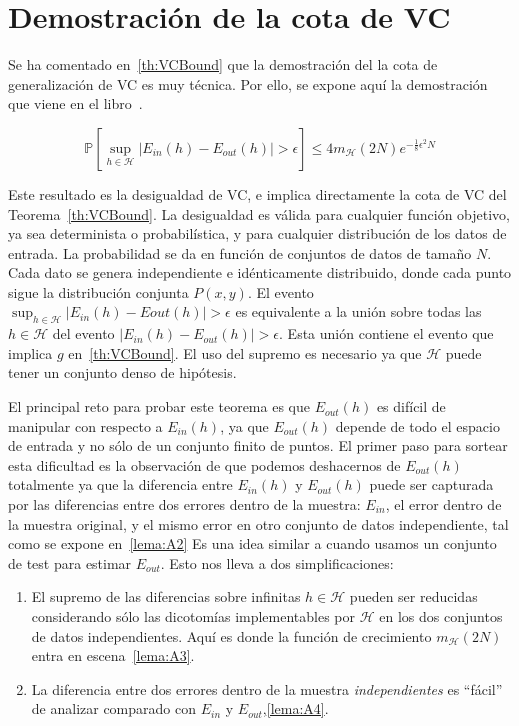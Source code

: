 \appendix
\chapter{Demostración de la cota de VC}
\label{apendice:demVC}
Se ha comentado en~\ref{th:VCBound} que la demostración del la cota de
generalización de VC es muy técnica. Por ello, se expone aquí la demostración
que viene en el libro~\cite{Abu-Mostafa:2012:LD:2207825}.

\begin{teorema}
  \label{th:A1}
   \begin{displaymath}
       \mathbb{P} \left [\sup_{h \in \mathcal{H}} | E_{in}(h) - E_{out}(h) | > \epsilon \right] \leq 4m_{\mathcal{H}}(2N)e^{-\frac{1}{8} \epsilon^2 N}
   \end{displaymath}
\end{teorema}

Este resultado es la desigualdad de VC, e implica directamente la cota de VC
del Teorema~\ref{th:VCBound}. La desigualdad es válida para cualquier función
objetivo, ya sea determinista o probabilística, y para cualquier distribución
de los datos de entrada. La probabilidad se da en función de conjuntos de datos
de tamaño $N$. Cada dato se genera independiente e idénticamente distribuido,
donde cada punto sigue la distribución conjunta $P(x,y)$. El evento
$\sup_{h \in \mathcal{H}} | E_{in}(h) - E{out}(h) | > \epsilon$ es equivalente
a la unión sobre todas las $h \in \mathcal{H}$ del evento
$| E_{in}(h) - E_{out}(h) | > \epsilon$. Esta unión contiene el evento que
implica $g$ en~\ref{th:VCBound}. El uso del supremo es necesario ya que
$\mathcal{H}$ puede tener un conjunto denso de hipótesis.

El principal reto para probar este teorema es que $E_{out}(h)$ es difícil de
manipular con respecto a $E_{in}(h)$, ya que $E_{out}(h)$ depende de todo el
espacio de entrada y no sólo de un conjunto finito de puntos. El primer paso
para sortear esta dificultad es la observación de que podemos deshacernos de
$E_{out}(h)$ totalmente ya que la diferencia entre $E_{in}(h)$ y $E_{out}(h)$
puede ser capturada por las diferencias entre dos errores dentro de la muestra:
$E_{in}$, el error dentro de la muestra original, y el mismo error en otro
conjunto de datos independiente, tal como se expone en~\ref{lema:A2}
Es una idea similar a cuando usamos un conjunto de test para estimar $E_{out}$.
Esto nos lleva a dos simplificaciones:

\begin{enumerate}
    \item
    El supremo de las diferencias sobre infinitas $h \in \mathcal{H}$ pueden ser
    reducidas considerando sólo las dicotomías implementables por $\mathcal{H}$
    en los dos conjuntos de datos independientes. Aquí es donde la función
    de crecimiento $m_{\mathcal{H}}(2N)$ entra en escena~\ref{lema:A3}.
    \item
    La diferencia entre dos errores dentro de la muestra \emph{independientes}
    es ``fácil'' de analizar comparado con $E_{in}$ y $E_{out}$,\ref{lema:A4}.
\end{enumerate}

